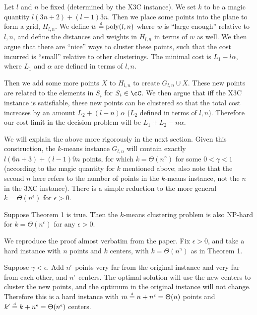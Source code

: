 Let $l$ and $n$ be fixed (determined by the X3C instance). We set $k$ to be a
magic quantity $l(3n+2)+(l-1)3n$. Then we place some points into the plane to
form a grid, $H_{l,n}$. We define $w \overset{\text{\tiny d}}{=} \text{poly}(l, n)$ where $w$ is
``large enough'' relative to $l,n$, and define the distances and weights in
$H_{l,n}$ in terms of $w$ as well. We then argue that there are ``nice'' ways
to cluster these points, such that the cost incurred is ``small'' relative to
other clusterings. The minimal cost is $L_1-l\alpha$, where $L_1$ and $\alpha$
are defined in terms of $l,n$.

Then we add some more points $X$ to $H_{l,n}$ to create $G_{l,n}\cup X$. These
new points are related to the elements in $S_i$ for $S_i\in\cC$. We then argue
that iff the X3C instance is satisfiable, these new points can be clustered so
that the total cost increases by an amount $L_2+(l-n)\alpha$ ($L_2$ defined in
terms of $l,n$). Therefore our cost limit in the decision problem will be $L_1+L_2-n\alpha$.

We will explain the above more rigorously in the next section. Given this construction, the $k$-means instance $G_{l,n}$ will contain exactly $l(6n+3)+(l-1)9n$ points, for which $k=\Theta(n^\gamma)$ for some $0<\gamma<1$ (according to the magic quantity for $k$ mentioned above; also note that the second $n$ here refers to the number of points in the $k$-means instance, not the $n$ in the 3XC instance). There is a simple reduction to the more general $k=\Theta(n^\epsilon)$ for $\epsilon>0$.\\

\begin{theorem}
    Suppose Theorem 1 is true. Then the $k$-means clustering problem is also NP-hard for $k=\Theta(n^\epsilon)$ for any $\epsilon>0$.
\end{theorem}

We reproduce the proof almost verbatim from the paper. Fix $\epsilon>0$, and take a hard instance with $n$ points and $k$ centers, with $k=\Theta(n^\gamma)$ as in Theorem 1.

Suppose $\gamma<\epsilon$. Add $n^\epsilon$ points very far from the original
instance and very far from each other, and $n^\epsilon$ centers. The optimal
solution will use the new centers to cluster the new points, and the optimum
in the original instance will not change. Therefore this is a hard instance with
$m \overset{\text{\tiny d}}{=} n+n^\epsilon=\Theta(n)$ points and
$k' \overset{\text{\tiny d}}{=} k+n^\epsilon=\Theta(n^\epsilon)$ centers.

